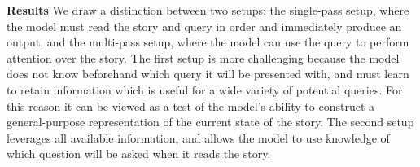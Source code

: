 \documentclass{article} \usepackage{iclr2016_conference,times}
\begin{document}
\begin{table}[t]
\caption{Accuracy on CBT test set. Single-pass models encode the document before seeing the query, multi-pass models have access to the query at read time.}
\label{cbt-results}
\begin{center}
\end{center}
\end{table}


\textbf{Results} 
We draw a distinction between two setups: the single-pass setup, where the model must read the story and query in order and immediately produce an output, and the multi-pass setup, where the model can use the query to perform attention over the story. 
The first setup is more challenging because the model does not know beforehand which query it will be presented with, and must learn to retain information which is useful for a wide variety of potential queries. 
For this reason it can be viewed as a test of the model's ability to construct a general-purpose representation of the current state of the story. 
The second setup leverages all available information, and allows the model to use knowledge of which question will be asked when it reads the story. 
\end{document}
